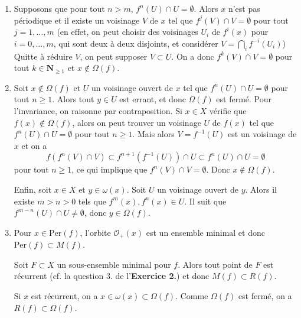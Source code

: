 \documentclass[a4paper,12pt,openany]{article}
\theoremstyle{plain}
\theoremstyle{definition}
\newcommand{\N}{\mathbf{N}}
\begin{document}
\begin{enumerate}
\item  Supposons que pour tout $n > m$, $f^n(U) \cap U = \emptyset$. Alors $x$ n'est pas p\'eriodique et il existe un voisinage $V$ de $x$ tel que $f^j(V) \cap V = \emptyset$ pour tout $j = 1, \dots, m$ (en effet, on peut choisir des voisinages $U_i$ de $f^i(x)$ pour $i = 0, \dots, m$, qui sont deux \`a deux disjoints, et consid\'erer $V = \bigcap_i f^{-i}(U_i)$) Quitte \`a r\'eduire $V$, on peut supposer $V \subset U$. On a donc $f^k(V) \cap V = \emptyset$ pour tout $k \in \N_{\geqslant 1}$ et $x \notin \Omega(f)$.


\item Soit $x \notin \Omega(f)$ et $U$ un voisinage ouvert de $x$ tel que $f^n(U) \cap U = \emptyset$ pour tout $n \geqslant 1$. Alors tout $y \in U$ est errant, et donc $\Omega(f)$ est ferm\'e. Pour l'invariance, on raisonne par contraposition. Si $x \in X$ v\'erifie que $f(x) \notin \Omega(f)$, alors on peut trouver un voisinage $U$ de $f(x)$ tel que $f^n(U) \cap U = \emptyset$ pour tout $n \geqslant 1.$ Mais alors $V = f^{-1}(U)$ est un voisinage de $x$ et on a
$$
f(f^n(V) \cap V) \subset f^{n+1}(f^{-1}(U)) \cap U \subset f^{n}(U) \cap U = \emptyset
$$
pour tout $n \geqslant 1$, ce qui implique que $f^n(V) \cap V = \emptyset$. Donc $x \notin \Omega(f).$

Enfin, soit $x \in X$ et $y \in \omega(x)$. Soit $U$ un voisinage ouvert de $y$. Alors il existe $m > n> 0$ tels que $f^m(x), f^n(x) \in U$. Il suit que $f^{m-n}(U) \cap U \neq \emptyset$, donc $y \in \Omega(f).$

\item Pour $x \in \mathrm{Per}(f)$, l'orbite $\mathcal{O}_+(x)$ est un ensemble minimal et donc $\mathrm{Per}(f) \subset M(f)$.

Soit $F\subset X$ un sous-ensemble minimal pour $f$. Alors tout point de $F$ est r\'ecurrent (cf. la question 3. de l'\textbf{Exercice 2.}) et donc $M(f) \subset R(f)$.

Si $x$ est r\'ecurrent, on a $x \in \omega(x) \subset \Omega(f)$. Comme $\Omega(f)$ est ferm\'e, on a $R(f) \subset \Omega(f)$.

\end{enumerate}

\vspace{0.6cm}
\end{document}
